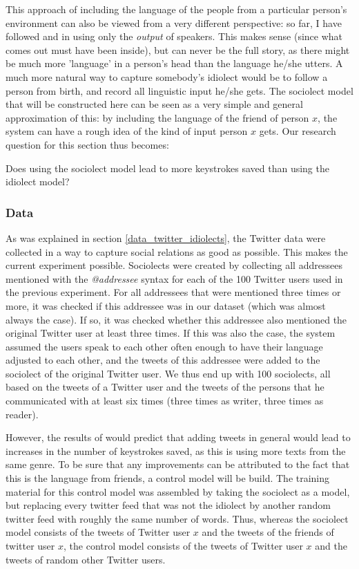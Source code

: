 \documentclass[12pt]{article}
\begin{document}
This approach of including the language of the people from a particular person's environment can also be viewed from a very different perspective: so far, I have followed  and  in using only the \emph{output} of speakers. This makes sense (since what comes out must have been inside), but can never be the full story, as there might be much more 'language' in a person's head than the language he/she utters. A much more natural way to capture somebody's idiolect would be to follow a person from birth, and record all linguistic input he/she gets. The sociolect model that will be constructed here can be seen as a very simple and general approximation of this: by including the language of the friend of person $x$, the system can have a rough idea of the kind of input person $x$ gets. Our research question for this section thus becomes:

\begin{examples}
\item Does using the sociolect model lead to more keystrokes saved than using the idiolect model?
\end{examples}

\subsubsection{Data}
As was explained in section \ref{data_twitter_idiolects}, the Twitter data were collected in a way to capture social relations as good as possible. This makes the current experiment possible. Sociolects were created by collecting all addressees mentioned with the \emph{@addressee} syntax for each of the 100 Twitter users used in the previous experiment. For all addressees that were mentioned three times or more, it was checked if this addressee was in our dataset (which was almost always the case). If so, it was checked whether this addressee also mentioned the original Twitter user at least three times. If this was also the case, the system assumed the users speak to each other often enough to have their language adjusted to each other, and the tweets of this addressee were added to the sociolect of the original Twitter user. We thus end up with 100 sociolects, all based on the tweets of a Twitter user and the tweets of the persons that he communicated with at least six times (three times as writer, three times as reader).

However, the results of  would predict that adding tweets in general would lead to increases in the number of keystrokes saved, as this is using more texts from the same genre. To be sure that any improvements can be attributed to the fact that this is the language from friends, a control model will be build. The training material for this control model was assembled by taking the sociolect as a model, but replacing every twitter feed that was not the idiolect by another random twitter feed with roughly the same number of words. Thus, whereas the sociolect model consists of the tweets of Twitter user $x$ and the tweets of the friends of twitter user $x$, the control model consists of the tweets of Twitter user $x$ and the tweets of random other Twitter users.
\end{document}
